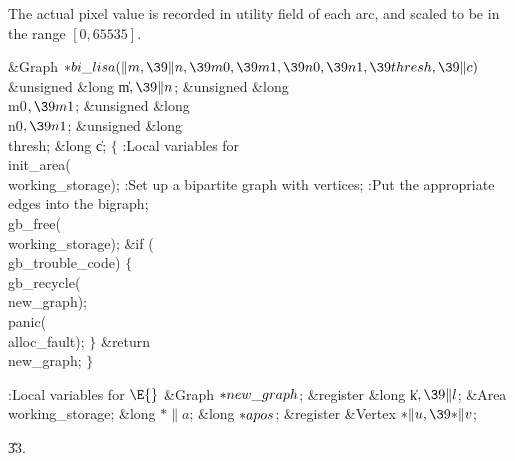 The actual pixel value is recorded in utility field  of each arc,
and scaled to be in the range $[0,65535]$.

\Y\B\1\1\&{Graph} ${}{*}\\{bi\_lisa}(\|m,\39\|n,\39\\{m0},\39\\{m1},\39\\{n0},%
\39\\{n1},\39\\{thresh},\39\|c){}$\6
\&{unsigned} \&{long} \|m${},\39\|n{}$;%
\6
\&{unsigned} \&{long} \\{m0}${},\39\\{m1}{}$;\C{ input will be from rows $[\PB{%
\\{m0}}\,.\,.\,\PB{\\{m1}})$ }\6
\&{unsigned} \&{long} \\{n0}${},\39\\{n1}{}$;\C{ and from columns $[\PB{\\{n0}}%
\,.\,.\,\PB{\\{n1}})$ }\6
\&{unsigned} \&{long} \\{thresh};\6
\&{long} \|c;\2\2\6
${}\{{}$\5
\1:Local variables for \X\7
\\{init\_area}(\\{working\_storage});\6
:Set up a bipartite graph with  vertices\X;\6
:Put the appropriate edges into the bigraph\X;\6
\\{gb\_free}(\\{working\_storage});\6
\&{if} (\\{gb\_trouble\_code})\5
${}\{{}$\1\6
\\{gb\_recycle}(\\{new\_graph});\6
\\{panic}(\\{alloc\_fault});\6
\4${}\}{}$\2\6
\&{return} \\{new\_graph};\6
\4${}\}{}$\2\par
\fi

\B{}:Local variables for \X${}\E{}$\6
\&{Graph} ${}{*}\\{new\_graph}{}$;\6
\&{register} \&{long} \|k${},\39\|l{}$;\6
\&{Area} \\{working\_storage};\6
\&{long} ${}{*}\|a{}$;\6
\&{long} ${}{*}\\{apos}{}$;\6
\&{register} \&{Vertex} ${}{*}\|u,\39{*}\|v{}$;\par
\U33.\fi

